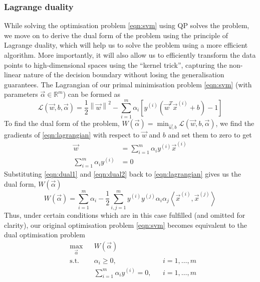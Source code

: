 \subsubsection{Lagrange duality}
	While solving the optimisation problem \eqref{eqn:svm} using QP solves the problem, we move on to derive the dual form of the problem using the principle of Lagrange duality, which will help us to solve the problem using a more efficient algorithm. More importantly, it will also allow us to efficiently transform the data points to high-dimensional spaces using the ``kernel trick'', capturing the non-linear nature of the decision boundary without losing the generalisation guarantees. The Lagrangian of our primal minimisation problem \eqref{eqn:svm} (with parameters $\vec{\alpha} \in \mathbb{R}^m$) can be formed as
	\begin{equation}
		\mathcal{L}(\vec{w}, b, \vec{\alpha}) = \frac{1}{2} \left\| \vec{w} \right\|^2 - \sum_{i=1}^{m} \alpha_i \left[ y^{(i)}\left( \vec{w}^T \vec{x}^{(i)} + b \right) - 1 \right]
	\label{eqn:lagrangian}
	\end{equation}
To find the dual form of the problem, $W(\vec{\alpha}) = \min_{\vec{w}, b} \mathcal{L}(\vec{w}, b, \vec{\alpha})$, we find the gradients of \eqref{eqn:lagrangian} with respect to $\vec{w}$ and $b$ and set them to zero to get
	\begin{align}
		\vec{w} 					& = \sum_{i = 1}^{m} \alpha_i y^{(i)} \vec{x}^{(i)} \label{eqn:dual1}\\
		\sum_{i = 1}^{m} \alpha_i y^{(i)}	& = 0 \label{eqn:dual2}
	\end{align}
Substituting \eqref{eqn:dual1} and \eqref{eqn:dual2} back to \eqref{eqn:lagrangian} gives us the dual form, $W(\vec{\alpha})$
	\begin{equation}
		W(\vec{\alpha}) = \sum_{i = 1}^{m} \alpha_i - \frac{1}{2} \sum_{i, j = 1}^{m} y^{(i)} y^{(j)} \alpha_i \alpha_j \left\langle \vec{x}^{(i)}, \vec{x}^{(j)} \right\rangle
		\label{eqn:dualForm}
	\end{equation}
Thus, under certain conditions which are in this case fulfilled (and omitted for clarity), our original optimisation problem \eqref{eqn:svm} becomes equivalent to the dual optimisation problem
	\begin{equation}
	\begin{aligned}
		& \max_{\vec\alpha}
		& & W(\vec{\alpha}) \\
		& \text{s.t.}
		& & \alpha_i \geq 0, & &  i = 1, \dotsc, m \\
		& & & \sum_{i = 1}^{m} \alpha_i y^{(i)} = 0, & &  i = 1, \dotsc, m
	\label{eqn:dualOpt}
	\end{aligned}
	\end{equation}

